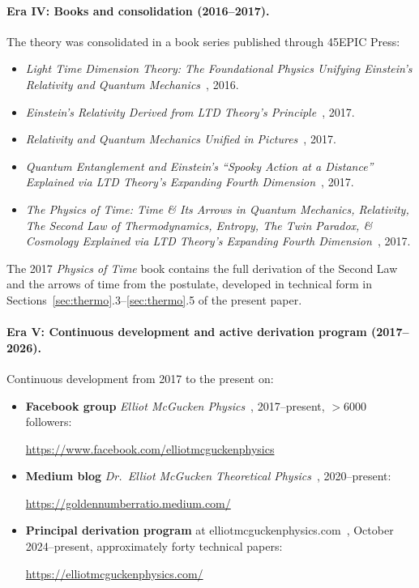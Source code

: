 \documentclass[11pt,a4paper]{article}
\begin{document}
\paragraph{Era IV: Books and consolidation (2016--2017).} The theory was consolidated in a book series published through 45EPIC Press:
\begin{itemize}
\item \emph{Light Time Dimension Theory: The Foundational Physics Unifying Einstein's Relativity and Quantum Mechanics}~\cite{mcguckenbook2016}, 2016.
\item \emph{Einstein's Relativity Derived from LTD Theory's Principle}~\cite{mcguckenbook2017a}, 2017.
\item \emph{Relativity and Quantum Mechanics Unified in Pictures}~\cite{mcguckenbook2017b}, 2017.
\item \emph{Quantum Entanglement and Einstein's ``Spooky Action at a Distance'' Explained via LTD Theory's Expanding Fourth Dimension}~\cite{mcguckenbook2017c}, 2017.
\item \emph{The Physics of Time: Time \& Its Arrows in Quantum Mechanics, Relativity, The Second Law of Thermodynamics, Entropy, The Twin Paradox, \& Cosmology Explained via LTD Theory's Expanding Fourth Dimension}~\cite{mcguckenbook2017d}, 2017.
\end{itemize}
The 2017 \emph{Physics of Time} book contains the full derivation of the Second Law and the arrows of time from the postulate, developed in technical form in Sections~\ref{sec:thermo}.3--\ref{sec:thermo}.5 of the present paper.

\paragraph{Era V: Continuous development and active derivation program (2017--2026).} Continuous development from 2017 to the present on:
\begin{itemize}
\item \textbf{Facebook group} \emph{Elliot McGucken Physics}~\cite{mcguckenfb}, 2017--present, $>6000$ followers:
\begin{center}\url{https://www.facebook.com/elliotmcguckenphysics}\end{center}
\item \textbf{Medium blog} \emph{Dr.\ Elliot McGucken Theoretical Physics}~\cite{mcguckenmedium}, 2020--present:
\begin{center}\url{https://goldennumberratio.medium.com/}\end{center}
\item \textbf{Principal derivation program} at elliotmcguckenphysics.com~\cite{mcguckenphysicscom}, October 2024--present, approximately forty technical papers:
\begin{center}\url{https://elliotmcguckenphysics.com/}\end{center}
\end{itemize}
\end{document}
